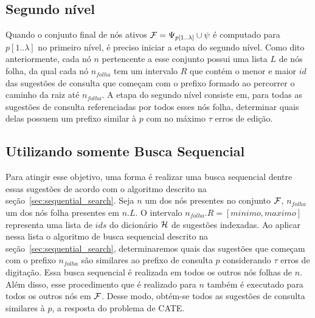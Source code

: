                 

\subsection{Segundo nível}
\label{sec:second_level}

Quando o conjunto final de nós ativos $\mathcal{F} = \Psi_{p[1..\lambda]} \cup \psi$ é computado para $p[1..\lambda]$ no primeiro nível, é preciso iniciar a etapa do segundo nível. Como dito anteriormente, cada nó $n$ pertencente a esse conjunto possui uma lista $L$ de nós folha, da qual cada nó $n_{folha}$ tem um intervalo $R$ que contém o menor e maior $id$ das sugestões de consulta que começam com o prefixo formado ao percorrer o caminho da raiz até $n_{folha}$. A etapa do segundo nível consiste em, para todas as sugestões de consulta referenciadas por todos esses nós folha, determinar quais delas possuem um prefixo similar à $p$ com no máximo $\tau$ erros de edição. 

\subsection{Utilizando somente Busca Sequencial} 
\label{sec:IP2L}

Para atingir esse objetivo, uma forma é realizar uma busca sequencial dentre essas sugestões de acordo com o algoritmo descrito na seção~\ref{sec:sequential_search}. Seja $n$ um dos nós presentes no conjunto $\mathcal{F}$, $n_{folha}$ um dos nós folha presentes em $n.L$. O intervalo $n_{folha}.R = [minimo, maximo]$ representa uma lista de $ids$ do dicionário $\mathcal{H}$ de sugestões indexadas. Ao aplicar nessa lista o algoritmo de busca sequencial descrito na seção~\ref{sec:sequential_search}, determinaremos quais das sugestões que começam com o prefixo $n_{folha}$ são similares ao prefixo de consulta $p$ considerando $\tau$ erros de digitação. Essa busca sequencial é realizada em todos os outros nós folhas de $n$. Além disso, esse procedimento que é realizado para $n$ também é executado para todos os outros nós em $\mathcal{F}$. Desse modo, obtém-se todos as sugestões de consulta similares à $p$, a resposta do problema de CATE.

